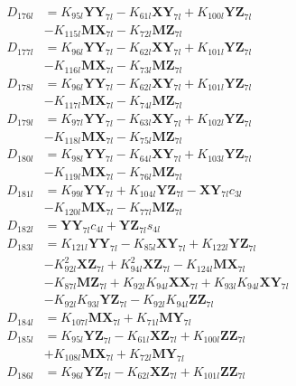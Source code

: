 \begin{align}
D_{176l} &= K_{95l}\mathbf{YY}_{7l} - K_{61l}\mathbf{XY}_{7l} + K_{100l}\mathbf{YZ}_{7l}  \nonumber \\
&- K_{115l}\mathbf{MX}_{7l} - K_{72l}\mathbf{MZ}_{7l} \nonumber \\
D_{177l} &= K_{96l}\mathbf{YY}_{7l} - K_{62l}\mathbf{XY}_{7l} + K_{101l}\mathbf{YZ}_{7l}  \nonumber \\
&- K_{116l}\mathbf{MX}_{7l} - K_{73l}\mathbf{MZ}_{7l} \nonumber \\
D_{178l} &= K_{96l}\mathbf{YY}_{7l} - K_{62l}\mathbf{XY}_{7l} + K_{101l}\mathbf{YZ}_{7l}  \nonumber \\
&- K_{117l}\mathbf{MX}_{7l} - K_{74l}\mathbf{MZ}_{7l} \nonumber \\
D_{179l} &= K_{97l}\mathbf{YY}_{7l} - K_{63l}\mathbf{XY}_{7l} + K_{102l}\mathbf{YZ}_{7l}  \nonumber \\
&- K_{118l}\mathbf{MX}_{7l} - K_{75l}\mathbf{MZ}_{7l} \nonumber \\
D_{180l} &= K_{98l}\mathbf{YY}_{7l} - K_{64l}\mathbf{XY}_{7l} + K_{103l}\mathbf{YZ}_{7l}  \nonumber \\
&- K_{119l}\mathbf{MX}_{7l} - K_{76l}\mathbf{MZ}_{7l} \nonumber \\
D_{181l} &= K_{99l}\mathbf{YY}_{7l} + K_{104l}\mathbf{YZ}_{7l} - \mathbf{XY}_{7l}c_{3l}  \nonumber \\
&- K_{120l}\mathbf{MX}_{7l} - K_{77l}\mathbf{MZ}_{7l} \nonumber \\
D_{182l} &= \mathbf{YY}_{7l}c_{4l} + \mathbf{YZ}_{7l}s_{4l} \nonumber \\
D_{183l} &= K_{121l}\mathbf{YY}_{7l} - K_{85l}\mathbf{XY}_{7l} + K_{122l}\mathbf{YZ}_{7l}  \nonumber \\
&- K_{92l}^2\mathbf{XZ}_{7l} + K_{94l}^2\mathbf{XZ}_{7l} - K_{124l}\mathbf{MX}_{7l}  \nonumber \\
&- K_{87l}\mathbf{MZ}_{7l} + K_{92l}K_{94l}\mathbf{XX}_{7l} + K_{93l}K_{94l}\mathbf{XY}_{7l}  \nonumber \\
&- K_{92l}K_{93l}\mathbf{YZ}_{7l} - K_{92l}K_{94l}\mathbf{ZZ}_{7l} \nonumber \\
D_{184l} &= K_{107l}\mathbf{MX}_{7l} + K_{71l}\mathbf{MY}_{7l} \nonumber \\
D_{185l} &= K_{95l}\mathbf{YZ}_{7l} - K_{61l}\mathbf{XZ}_{7l} + K_{100l}\mathbf{ZZ}_{7l}  \nonumber \\
&+ K_{108l}\mathbf{MX}_{7l} + K_{72l}\mathbf{MY}_{7l} \nonumber \\
D_{186l} &= K_{96l}\mathbf{YZ}_{7l} - K_{62l}\mathbf{XZ}_{7l} + K_{101l}\mathbf{ZZ}_{7l}  \nonumber \\

\end{align}
